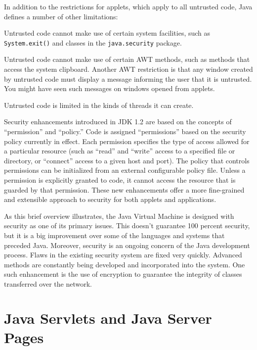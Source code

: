 In addition to the restrictions for applets, which
apply to all untrusted code, Java defines a number of
other limitations:

\begin{BL}
\item  Untrusted code cannot make use of certain system
facilities, such as {\tt System.exit()} and classes
in the {\tt java.security} package.

\item  Untrusted code cannot make use of certain AWT
methods, such as methods that access the system clipboard.   Another
AWT restriction is that any window created by untrusted code must
display a message informing the user that it is untrusted.  You might
have seen such messages on windows opened from applets.

\item  Untrusted code is limited in the kinds of threads
it can create.
\end{BL}

Security enhancements introduced in JDK 1.2 are based on the
concepts of ``permission'' and ``policy.'' Code is assigned
``permissions'' based on the security policy currently in effect.  Each
permission specifies the type of access allowed for a particular
resource (such as ``read'' and ``write'' access to a specified file or
directory, or ``connect'' access to a given host and port). The
policy that controls permissions can be initialized from an external
configurable policy file.  Unless a permission is explicitly granted to
code, it cannot access the resource that is guarded by that
permission.   These new enhancements offer a more fine-grained and
extensible approach to security for both applets and applications.

As this brief overview illustrates, the Java Virtual Machine is
designed with security as one of its primary issues.  This
doesn't guarantee 100 percent
security, but it is a big improvement over some of
the languages and systems that preceded Java.   Moreover, security is
an ongoing concern of the Java development process.   Flaws in the existing
security system are fixed very quickly.   Advanced methods are
constantly being developed and incorporated into the system.  One such
enhancement is the use of encryption to guarantee the integrity of
classes transferred over the network.

\section{Java Servlets and Java Server Pages}

